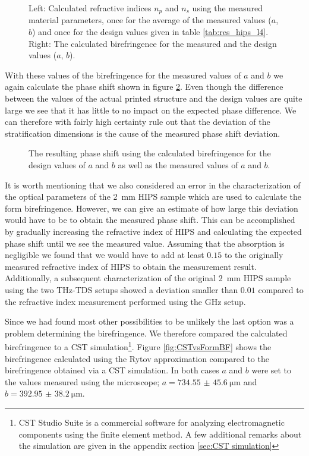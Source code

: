 \begin{figure}[H]
    \centering
    
    \caption{Left: Calculated refractive indices $n_p$ and $n_s$ using the measured material parameters, once for the average of the measured values ($a$, $b$) and once for the design values given in table \ref{tab:res_hips_l4}. Right: The calculated birefringence for the measured and the design values ($a$, $b$).}
    \label{fig:ri_stripe_err}
\end{figure}

With these values of the birefringence for the measured values of $a$ and $b$ we again calculate the phase shift shown in figure \ref{fig:delta_stripe_err}. Even though the difference between the values of the actual printed structure and the design values are quite large we see that it has little to no impact on the expected phase difference. We can therefore with fairly high certainty rule out that the deviation of the stratification dimensions is the cause of the measured phase shift deviation.

\begin{figure}[H]
    \centering
    
    \caption{The resulting phase shift using the calculated birefringence for the design values of $a$ and $b$ as well as the measured values of $a$ and $b$.}
    \label{fig:delta_stripe_err}
\end{figure}

It is worth mentioning that we also considered an error in the characterization of the optical parameters of the \SI{2}{\milli \meter} HIPS sample which are used to calculate the form birefringence. However, we can give an estimate of how large this deviation would have to be to obtain the measured phase shift. This can be accomplished by gradually increasing the refractive index of HIPS and calculating the expected phase shift until we see the measured value. Assuming that the absorption is negligible we found that we would have to add at least $0.15$ to the originally measured refractive index of HIPS to obtain the measurement result. Additionally, a subsequent characterization of the original \SI{2}{\milli \meter} HIPS sample using the two THz-TDS setups showed a deviation smaller than $0.01$ compared to the refractive index measurement performed using the GHz setup.

Since we had found most other possibilities to be unlikely the last option was a problem determining the birefringence. We therefore compared the calculated birefringence to a CST simulation\footnote{CST Studio Suite is a commercial software for analyzing electromagnetic components using the finite element method. A few additional remarks about the simulation are given in the appendix section \ref{sec:CST simulation}}. Figure \ref{fig:CSTvsFormBF} shows the birefringence calculated using the Rytov approximation compared to the birefringence obtained via a CST simulation. In both cases $a$ and $b$ were set to the values measured using the microscope; $a=\SI[separate-uncertainty = true]{734.55(4560)}{\micro \meter}$ and $b=\SI[separate-uncertainty = true]{392.95(3820)}{\micro \meter}$.

